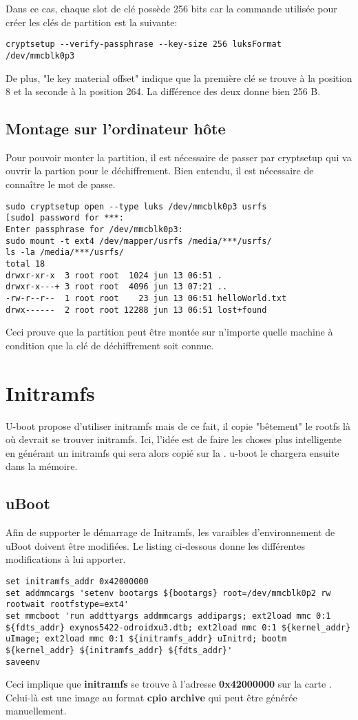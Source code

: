 Dans ce cas, chaque slot de clé possède 256 bits car la commande utilisée pour créer les clés de partition est la suivante:
\begin{lstlisting}
cryptsetup --verify-passphrase --key-size 256 luksFormat /dev/mmcblk0p3
\end{lstlisting}
De plus, "le key material offset" indique que la première clé se trouve à la position 8 et la seconde à la position 264. La différence des deux donne bien 256 B.

\subsection{Montage sur l'ordinateur hôte}
Pour pouvoir monter la partition, il est nécessaire de passer par cryptsetup qui va ouvrir la partion pour le déchiffrement. Bien entendu, il est nécessaire de connaître le mot de passe.
\begin{lstlisting}
sudo cryptsetup open --type luks /dev/mmcblk0p3 usrfs
[sudo] password for ***: 
Enter passphrase for /dev/mmcblk0p3:
sudo mount -t ext4 /dev/mapper/usrfs /media/***/usrfs/
ls -la /media/***/usrfs/
total 18
drwxr-xr-x  3 root root  1024 jun 13 06:51 .
drwxr-x---+ 3 root root  4096 jun 13 07:21 ..
-rw-r--r--  1 root root    23 jun 13 06:51 helloWorld.txt
drwx------  2 root root 12288 jun 13 06:51 lost+found
\end{lstlisting}
Ceci prouve que la partition peut être montée sur n'importe quelle machine à condition que la clé de déchiffrement soit connue.

\section{Initramfs}
U-boot propose d'utiliser initramfs mais de ce fait, il copie "bêtement" le rootfs là où devrait se trouver initramfs. Ici, l'idée est de faire les choses plus intelligente en générant un initramfs qui sera alors copié sur la \usd. u-boot le chargera ensuite dans la mémoire.

\href{http://forum.odroid.com/viewtopic.php?f=81&t=4860}{}

\subsection{uBoot}
Afin de supporter le démarrage de Initramfs, les varaibles d'environnement de uBoot doivent être modifiées. Le listing ci-dessous donne les différentes modifications à lui apporter.

\begin{lstlisting}
set initramfs_addr 0x42000000
set addmmcargs 'setenv bootargs ${bootargs} root=/dev/mmcblk0p2 rw rootwait rootfstype=ext4'
set mmcboot 'run addttyargs addmmcargs addipargs; ext2load mmc 0:1 ${fdts_addr} exynos5422-odroidxu3.dtb; ext2load mmc 0:1 ${kernel_addr} uImage; ext2load mmc 0:1 ${initramfs_addr} uInitrd; bootm ${kernel_addr} ${initramfs_addr} ${fdts_addr}'
saveenv
\end{lstlisting}
Ceci implique que \textbf{initramfs} se trouve à l'adresse \textbf{0x42000000} sur la carte \usd. Celui-là est une image au format \textbf{cpio archive} qui peut être générée manuellement.

